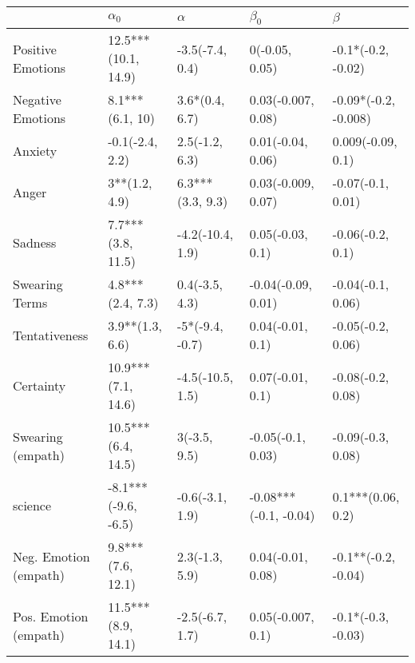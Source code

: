 \begin{tabular}{lllll}
\toprule
{} &           $\alpha_0$ &          $\alpha$ &              $\beta_0$ &               $\beta$ \\
\midrule
Positive Emotions     &  12.5***(10.1, 14.9) &   -3.5(-7.4, 0.4) &         0(-0.05, 0.05) &    -0.1*(-0.2, -0.02) \\
Negative Emotions     &      8.1***(6.1, 10) &    3.6*(0.4, 6.7) &     0.03(-0.007, 0.08) &  -0.09*(-0.2, -0.008) \\
Anxiety               &      -0.1(-2.4, 2.2) &    2.5(-1.2, 6.3) &      0.01(-0.04, 0.06) &     0.009(-0.09, 0.1) \\
Anger                 &        3**(1.2, 4.9) &  6.3***(3.3, 9.3) &     0.03(-0.009, 0.07) &     -0.07(-0.1, 0.01) \\
Sadness               &    7.7***(3.8, 11.5) &  -4.2(-10.4, 1.9) &       0.05(-0.03, 0.1) &      -0.06(-0.2, 0.1) \\
Swearing Terms        &     4.8***(2.4, 7.3) &    0.4(-3.5, 4.3) &     -0.04(-0.09, 0.01) &     -0.04(-0.1, 0.06) \\
Tentativeness         &      3.9**(1.3, 6.6) &   -5*(-9.4, -0.7) &       0.04(-0.01, 0.1) &     -0.05(-0.2, 0.06) \\
Certainty             &   10.9***(7.1, 14.6) &  -4.5(-10.5, 1.5) &       0.07(-0.01, 0.1) &     -0.08(-0.2, 0.08) \\
Swearing (empath)     &   10.5***(6.4, 14.5) &      3(-3.5, 9.5) &      -0.05(-0.1, 0.03) &     -0.09(-0.3, 0.08) \\
science               &  -8.1***(-9.6, -6.5) &   -0.6(-3.1, 1.9) &  -0.08***(-0.1, -0.04) &     0.1***(0.06, 0.2) \\
Neg. Emotion (empath) &    9.8***(7.6, 12.1) &    2.3(-1.3, 5.9) &      0.04(-0.01, 0.08) &   -0.1**(-0.2, -0.04) \\
Pos. Emotion (empath) &   11.5***(8.9, 14.1) &   -2.5(-6.7, 1.7) &      0.05(-0.007, 0.1) &    -0.1*(-0.3, -0.03) \\
\bottomrule
\end{tabular}
